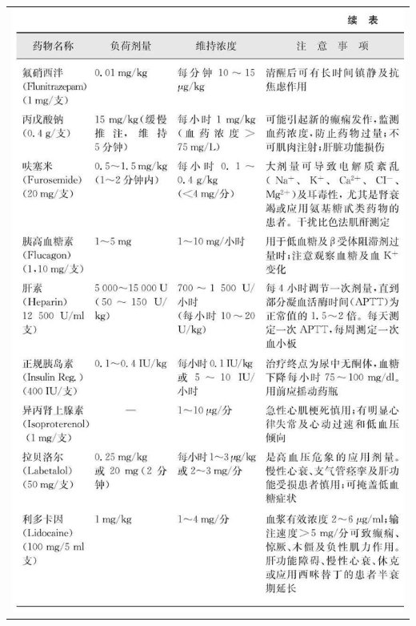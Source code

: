 \begin{longtable}{c}
\includegraphics[width=\textwidth,height=\textheight,keepaspectratio]{./images/Image00326.jpg}\\

\end{longtable}
